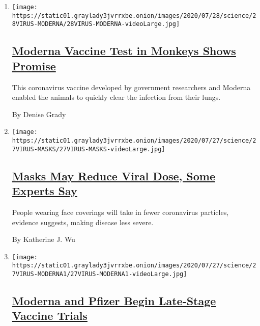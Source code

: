 \begin{enumerate}
\def\labelenumi{\arabic{enumi}.}
\item
  \texttt{[image: https://static01.graylady3jvrrxbe.onion/images/2020/07/28/science/28VIRUS-MODERNA/28VIRUS-MODERNA-videoLarge.jpg]}

  \hypertarget{moderna-vaccine-test-in-monkeys-shows-promise}{%
  \subsection{\texorpdfstring{\href{/2020/07/28/health/coronavirus-moderna-vaccine-monkeys.html}{Moderna
  Vaccine Test in Monkeys Shows
  Promise}}{Moderna Vaccine Test in Monkeys Shows Promise}}\label{moderna-vaccine-test-in-monkeys-shows-promise}}

  This coronavirus vaccine developed by government researchers and
  Moderna enabled the animals to quickly clear the infection from their
  lungs.

  By Denise Grady
\item
  \texttt{[image: https://static01.graylady3jvrrxbe.onion/images/2020/07/27/science/27VIRUS-MASKS/27VIRUS-MASKS-videoLarge.jpg]}

  \hypertarget{masks-may-reduce-viral-dose-some-experts-say}{%
  \subsection{\texorpdfstring{\href{/2020/07/27/health/coronavirus-mask-protection.html}{Masks
  May Reduce Viral Dose, Some Experts
  Say}}{Masks May Reduce Viral Dose, Some Experts Say}}\label{masks-may-reduce-viral-dose-some-experts-say}}

  People wearing face coverings will take in fewer coronavirus
  particles, evidence suggests, making disease less severe.

  By Katherine J. Wu
\item
  \texttt{[image: https://static01.graylady3jvrrxbe.onion/images/2020/07/27/science/27VIRUS-MODERNA1/27VIRUS-MODERNA1-videoLarge.jpg]}

  \hypertarget{moderna-and-pfizer-begin-late-stage-vaccine-trials}{%
  \subsection{\texorpdfstring{\href{/2020/07/27/health/moderna-vaccine-covid.html}{Moderna
  and Pfizer Begin Late-Stage Vaccine
  Trials}}{Moderna and Pfizer Begin Late-Stage Vaccine Trials}}\label{moderna-and-pfizer-begin-late-stage-vaccine-trials}}


\end{enumerate}
